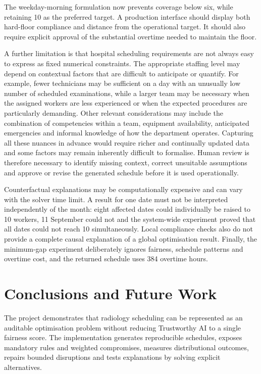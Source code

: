 \documentclass[11pt,a4paper]{article}
\begin{document}
The weekday-morning formulation now prevents coverage below six, while retaining 10 as the preferred target. A production interface should display both hard-floor compliance and distance from the operational target. It should also require explicit approval of the substantial overtime needed to maintain the floor.

A further limitation is that hospital scheduling requirements are not always easy to express as fixed numerical constraints. The appropriate staffing level may depend on contextual factors that are difficult to anticipate or quantify. For example, fewer technicians may be sufficient on a day with an unusually low number of scheduled examinations, while a larger team may be necessary when the assigned workers are less experienced or when the expected procedures are particularly demanding. Other relevant considerations may include the combination of competencies within a team, equipment availability, anticipated emergencies and informal knowledge of how the department operates. Capturing all these nuances in advance would require richer and continually updated data and some factors may remain inherently difficult to formalise. Human review is therefore necessary to identify missing context, correct unsuitable assumptions and approve or revise the generated schedule before it is used operationally.

Counterfactual explanations may be computationally expensive and can vary with the solver time limit. A result for one date must not be interpreted independently of the month: eight affected dates could individually be raised to 10 workers, 11 September could not and the system-wide experiment proved that all dates could not reach 10 simultaneously. Local compliance checks also do not provide a complete causal explanation of a global optimisation result. Finally, the minimum-gap experiment deliberately ignores fairness, schedule patterns and overtime cost, and the returned schedule uses 384 overtime hours.

\section{Conclusions and Future Work}

The project demonstrates that radiology scheduling can be represented as an auditable optimisation problem without reducing Trustworthy AI to a single fairness score. The implementation generates reproducible schedules, exposes mandatory rules and weighted compromises, measures distributional outcomes, repairs bounded disruptions and tests explanations by solving explicit alternatives.
\end{document}
